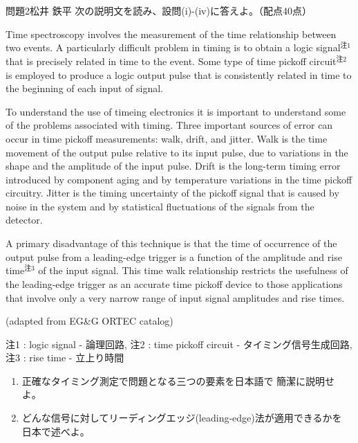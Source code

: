 \documentclass[fleqn]{jbook}
\begin{document}
\begin{question}{問題2}{松井 鉄平}
次の説明文を読み、設問(i)-(iv)に答えよ。（配点40点）

	Time spectroscopy involves the measurement of the time relationship 
between two events. A particularly difficult problem in timing is to 
obtain a logic signal$^{注1}$ that is precisely related in time to the 
event. Some type of time pickoff circuit$^{注2}$ is employed to produce a 
logic output pulse that is consistently related in time to the beginning of 
each input of signal.

	To understand the use of timeing electronics it is important to 
understand some of the problems associated with timing. Three important 
sources of error can occur in time pickoff measurements: walk, drift, and 
jitter. Walk is the time movement of the output pulse relative to its input 
pulse, due to variations in the shape and the amplitude of the input pulse. 
Drift is the long-term timing error introduced by component aging and 
by temperature variations in the time pickoff circuitry. Jitter is 
the timing uncertainty of the pickoff signal that is caused by noise in 
the system and by statistical fluctuations of the signals from the detector.

	 A primary disadvantage of 
this technique is that the time of occurrence of the output pulse from 
a leading-edge trigger is a function of the amplitude and rise time$^{注3}$ 
of the input signal. This time walk relationship restricts the usefulness of 
the leading-edge trigger as an accurate time pickoff device to those 
applications that involve only a very narrow range of input signal 
amplitudes and rise times.
\begin{flushright}
(adapted from EG\&G ORTEC catalog)
\end{flushright}
\hspace*{0.5cm}
注1 : logic signal - 論理回路, 注2 : time pickoff circuit - 
タイミング信号生成回路, 注3 : rise time - 立上り時間

\begin{enumerate}
\item 正確なタイミング測定で問題となる三つの要素を日本語で
簡潔に説明せよ。

\item どんな信号に対してリーディングエッジ(leading-edge)法が適用できるかを
日本で述べよ。


\end{enumerate}
\end{question}
\end{document}
